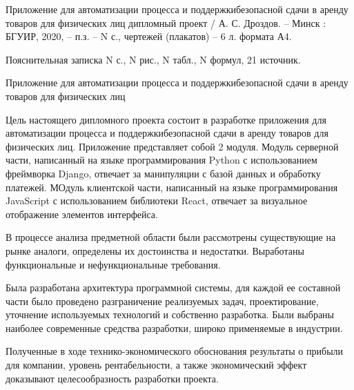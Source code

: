 \thispagestyle{empty}

Приложение для автоматизации процесса и поддержкибезопасной сдачи в аренду товаров для физических лиц дипломный проект / А. С. Дроздов. – Минск : БГУИР, 2020, – п.з. – N с., чертежей (плакатов) – 6 л. формата А4.

Пояснительная записка N с., N рис., N табл., N формул, 21 источник.

Приложение для автоматизации процесса и поддержкибезопасной сдачи в аренду товаров для физических лиц

Цель настоящего дипломного проекта состоит в разработке приложения для автоматизации процесса и поддержкибезопасной сдачи в аренду товаров для физических лиц.
Приложение представляет собой 2 модуля.
Модуль серверной части, написанный на языке программирования Python с использованием фреймворка Django, отвечает за манипуляции с базой данных и обработку платежей.
МОдуль клиентской части, написанный на языке программирования JavaScript с использованием библиотеки React, отвечает за визуальное отображение элементов интерфейса.

В процессе анализа предметной области были рассмотрены существующие на рынке аналоги, определены их достоинства и недостатки.
Выработаны функциональные и нефункциональные требования.

Была разработана архитектура программной системы, для каждой ее составной части было проведено разграничение реализуемых задач, проектирование, уточнение используемых технологий и собственно разработка.
Были выбраны наиболее современные средства разработки, широко применяемые в индустрии.

Полученные в ходе технико-экономического обоснования результаты о прибыли для компании, уровень рентабельности, а также экономический эффект доказывают целесообразность разработки проекта.
\pagebreak

